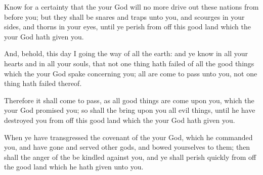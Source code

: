 {Know for a
certainty that the
{} your
God will no
more drive
out
{} these
nations from
before you; but they shall be
snares and
traps unto you, and
scourges in your
sides, and
thorns in your
eyes, until ye
perish from off this
good
land which the
{} your
God hath
given you.

And, behold, this
day I
{}
going the
way of all the
earth: and ye
know in all your
hearts and in all your
souls, that not
one
thing hath
failed of all the
good
things which the
{} your
God
spake concerning you; all are come to
pass unto you,
{} not
one
thing hath
failed thereof.

Therefore it shall come to pass,
{} as all
good
things are
come upon you, which the
{} your
God
promised you; so shall the
{}
bring upon you all
evil
things, until he have
destroyed you from off this
good
land which the
{} your
God hath
given you.

When ye have
transgressed the
covenant of the
{} your
God, which he
commanded you, and have
gone and
served
other
gods, and
bowed yourselves to them; then shall the
anger of the
{} be
kindled against you, and ye shall
perish
quickly from off the
good
land which he hath
given unto you.




\par }

